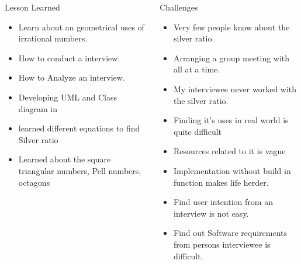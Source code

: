 \documentclass[final]{beamer}
\newlength{\onecolwid}
\newlength{\twocolwid}
\begin{document}
\begin{frame}[t]
\begin{columns}[t]
\begin{column}{\twocolwid}
\begin{columns}[t,totalwidth=\twocolwid]
\begin{column}{\onecolwid}
\begin{block}{Lesson Learned}
\begin{itemize}
\item Learn about an geometrical uses of irrational numbers.
\item How to conduct a interview.
\item How to Analyze an interview. 
\item Developing UML and Class diagram in 
\item learned different equations to find Silver ratio
\item Learned about the square triangular numbers, Pell numbers, octagons 
\end{itemize}

\end{block}



\end{column} %

\begin{column}{\onecolwid}\vspace{-.6in} %


\begin{block}{Challenges}
 \begin{itemize}
\item Very few people know about the silver ratio.
\item Arranging a group meeting with all at a time.
\item My interviewee never worked with the silver ratio.
\item Finding it's uses in real world is quite difficult
\item Resources related to it is vague 
\item Implementation without build in function makes life herder.
\item Find user intention from an interview is not easy.
\item Find out Software requirements from persons interviewee is difficult.
\end{itemize}
\end{block}


\end{column}
\end{columns}
\end{column}
\end{columns}
\end{frame}
\end{document}
